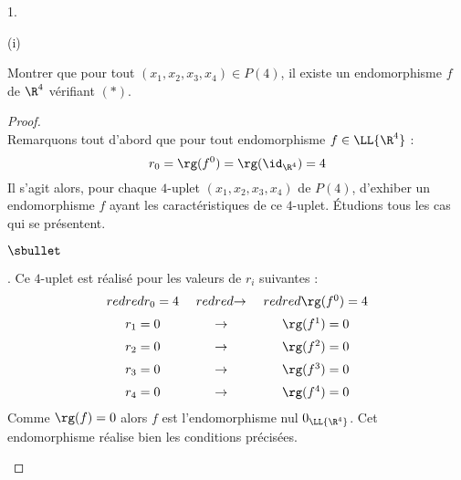 \begin{noliste}{1.}
    \newpage


    \begin{noliste}{(i)}
      \setcounter{enumii}{2}
    \item Montrer que pour tout $(x_1,x_2,x_3,x_4) \in P(4)$, il
      existe un endomorphisme $f$ de $\R^4$ vérifiant \nolinebreak
      $(*)$.

      \begin{proof}~\\%
        Remarquons tout d'abord que pour tout endomorphisme $f \in
        \LL{\R^4}$ : 
        \[
        r_0 = \rg(f^0) = \rg(\id_{\R^4}) = 4
        \]
        Il s'agit alors, pour chaque $4$-uplet $(x_1, x_2, x_3, x_4)$
        de $P(4)$, d'exhiber un endomorphisme $f$ ayant les
        caractéristiques de ce $4$-uplet. Étudions tous les cas qui se
        présentent.
        \begin{noliste}{$\sbullet$}
        \item {}. Ce
          $4$-uplet est réalisé pour les valeurs de $r_i$ suivantes :
          \[
          \begin{array}{c@{\ \quad}c@{\ \quad}c}
            \color{red}{r_0 = 4} & \color{red}{\rightarrow} &
            \color{red}{\rg(f^0) = 4} \\[.2cm] 
            r_1 = 0 & \rightarrow & \rg(f^1) = 0 \\[.2cm]
            r_2 = 0 & \rightarrow & \rg(f^2) = 0 \\[.2cm]
            r_3 = 0 & \rightarrow & \rg(f^3) = 0 \\[.2cm]
            r_4 = 0 & \rightarrow & \rg(f^4) = 0 
          \end{array}
          \]
          Comme $\rg(f) = 0$ alors $f$ est l'endomorphisme nul
          $0_{\LL{\R^4}}$. Cet endomorphisme réalise bien les
          conditions précisées.


\end{noliste}
\end{proof}
\end{noliste}
\end{noliste}

